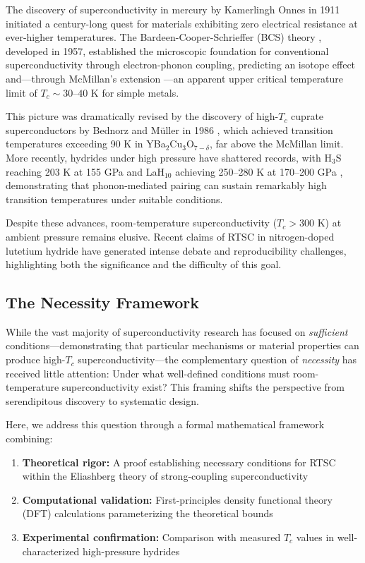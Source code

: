\documentclass[twocolumn,superscriptaddress]{revtex4-2}
\begin{document}
The discovery of superconductivity in mercury by Kamerlingh Onnes in 1911 \cite{onnes} initiated a century-long quest for materials exhibiting zero electrical resistance at ever-higher temperatures. The Bardeen-Cooper-Schrieffer (BCS) theory \cite{bcs}, developed in 1957, established the microscopic foundation for conventional superconductivity through electron-phonon coupling, predicting an isotope effect and---through McMillan's extension \cite{mcmillan}---an apparent upper critical temperature limit of $T_c \sim 30$--$40$ K for simple metals.

This picture was dramatically revised by the discovery of high-$T_c$ cuprate superconductors by Bednorz and M\"uller in 1986 \cite{bednorz}, which achieved transition temperatures exceeding 90 K in YBa$_2$Cu$_3$O$_{7-\delta}$, far above the McMillan limit. More recently, hydrides under high pressure have shattered records, with H$_3$S reaching 203 K at 155 GPa \cite{drozdov2015} and LaH$_{10}$ achieving 250--280 K at 170--200 GPa \cite{somayazulu2019,drozdov2019}, demonstrating that phonon-mediated pairing can sustain remarkably high transition temperatures under suitable conditions.

Despite these advances, room-temperature superconductivity ($T_c > 300$ K) at ambient pressure remains elusive. Recent claims of RTSC in nitrogen-doped lutetium hydride \cite{dasenbrock2023} have generated intense debate and reproducibility challenges, highlighting both the significance and the difficulty of this goal.

\subsection{The Necessity Framework}

While the vast majority of superconductivity research has focused on \textit{sufficient} conditions---demonstrating that particular mechanisms or material properties can produce high-$T_c$ superconductivity---the complementary question of \textit{necessity} has received little attention: Under what well-defined conditions must room-temperature superconductivity exist? This framing shifts the perspective from serendipitous discovery to systematic design.

Here, we address this question through a formal mathematical framework combining:
\begin{enumerate}
\item \textbf{Theoretical rigor:} A proof establishing necessary conditions for RTSC within the Eliashberg theory of strong-coupling superconductivity
\item \textbf{Computational validation:} First-principles density functional theory (DFT) calculations parameterizing the theoretical bounds
\item \textbf{Experimental confirmation:} Comparison with measured $T_c$ values in well-characterized high-pressure hydrides
\end{enumerate}
\end{document}
